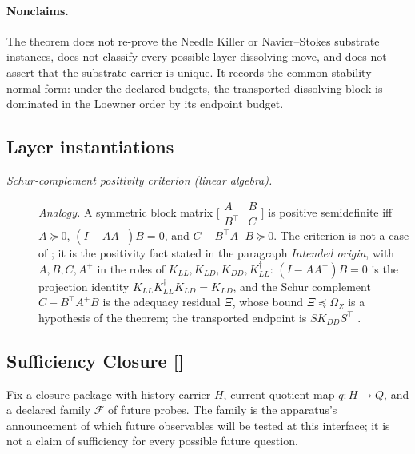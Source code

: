 \paragraph{Nonclaims.} The theorem does not re-prove the Needle Killer or Navier--Stokes
substrate instances, does not classify every possible
layer-dissolving move, and does not assert that the substrate carrier
is unique.  It records the common stability normal form: under the
declared budgets, the transported dissolving block is dominated in the Loewner
order by its endpoint budget.

\subsection*{Layer instantiations}\label{layer-inst:F6}

\begingroup\small
\begin{description}
\item[\emph{Schur-complement positivity criterion (linear algebra).}] \textit{Analogy.}
A symmetric block matrix
\(\bigl[\begin{smallmatrix}A&B\\B^{\!\top}&C\end{smallmatrix}\bigr]\)
is positive semidefinite iff \(A\succeq0\), \((I-AA^{+})B=0\), and
\(C-B^{\!\top}A^{+}B\succeq0\).  The criterion is not a case of ; it is the positivity fact stated in the paragraph \emph{Intended origin}, with \(A,B,C,A^{+}\) in the roles of \(K_{LL},K_{LD},K_{DD},K_{LL}^{\dagger}\): \((I-AA^{+})B=0\) is the projection identity \(K_{LL}K_{LL}^{\dagger}K_{LD}=K_{LD}\), and the Schur complement \(C-B^{\!\top}A^{+}B\) is the adequacy residual \(\Xi\), whose bound \(\Xi\preceq\Omega_Z\) is a hypothesis of the theorem; the transported endpoint is \(SK_{DD}S^{\!\top}\) \citep{Zhang2005SchurApplications}.

\end{description}
\endgroup


\subsection{Sufficiency Closure [\texorpdfstring{}{F7}]}\label{sec:stability:sufficiency-closure}

Fix a closure package with history carrier \(H\), current quotient
map \(q:H\to Q\), and a declared family \(\mathcal F\) of future
probes.  The family is the apparatus's announcement of which future
observables will be tested at this interface; it is not a claim of
sufficiency for every possible future question.


